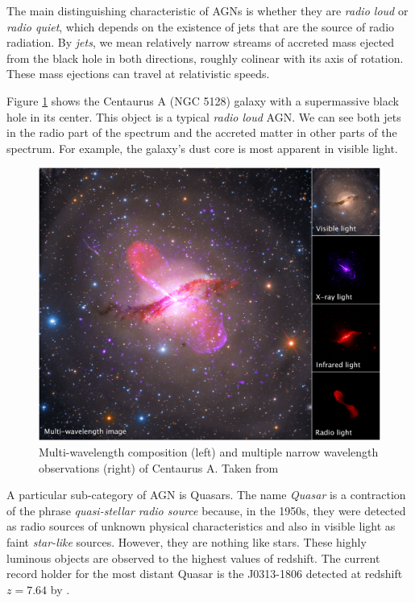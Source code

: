     The main distinguishing characteristic of AGNs is whether they are \emph{radio loud} or \emph{radio quiet}, which depends on the existence of jets that are the source of radio radiation. By \emph{jets}, we mean relatively narrow streams of accreted mass ejected from the black hole in both directions, roughly colinear with its axis of rotation. These mass ejections can travel at relativistic speeds. 
    
    Figure \ref{fig:centaurus_a_multiwave} shows the Centaurus A (NGC 5128) galaxy with a supermassive black hole in its center. This object is a typical \emph{radio loud} AGN. We can see both jets in the radio part of the spectrum and the accreted matter in other parts of the spectrum. For example, the galaxy's dust core is most apparent in visible light.

    \begin{figure}[t!]
        \centering
        \includegraphics[width=\columnwidth]{img/multiwave_centaurus_a_agn.png}
        \caption{Multi-wavelength composition (left) and multiple narrow wavelength observations (right) of Centaurus A. Taken from \citep{nasa_img_centaurus_a}}
        \label{fig:centaurus_a_multiwave}
    \end{figure}

    A particular sub-category of AGN is Quasars. The name \emph{Quasar} is a contraction of the phrase \emph{quasi-stellar radio source} because, in the 1950s, they were detected as radio sources of unknown physical characteristics and also in visible light as faint \emph{star-like} sources. However, they are nothing like stars. These highly luminous objects are observed to the highest values of redshift. The current record holder for the most distant Quasar is the J0313-1806 detected at redshift $z = 7.64$ by \citep{wang2021}. 

